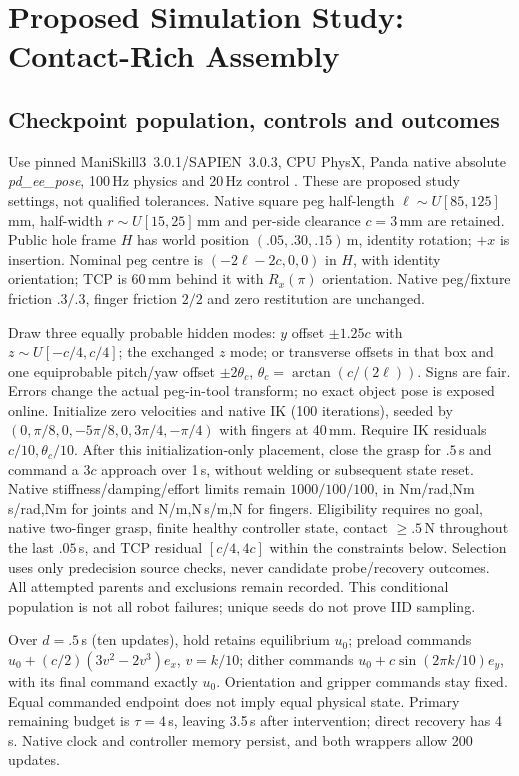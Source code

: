 \section{Proposed Simulation Study: Contact-Rich Assembly}
\subsection{Checkpoint population, controls and outcomes}
Use pinned ManiSkill3~3.0.1/SAPIEN~3.0.3, CPU PhysX, Panda native absolute \emph{pd\_ee\_pose}, 100\,Hz physics and 20\,Hz control \citep{tao2025}. These are proposed study settings, not qualified tolerances. Native square peg half-length $\ell\sim U[85, 125]$\,mm, half-width $r\sim U[15, 25]$\,mm and per-side clearance $c=3$\,mm are retained. Public hole frame $H$ has world position $(.05,.30,.15)$\,m, identity rotation; $+x$ is insertion. Nominal peg centre is $(-2\ell-2c, 0, 0)$ in $H$, with identity orientation; TCP is 60\,mm behind it with $R_x(\pi)$ orientation. Native peg/fixture friction $.3/.3$, finger friction $2/2$ and zero restitution are unchanged.

Draw three equally probable hidden modes: $y$ offset $\pm1.25c$ with $z\sim U[-c/4,c/4]$; the exchanged $z$ mode; or transverse offsets in that box and one equiprobable pitch/yaw offset $\pm2\theta_c$, $\theta_c=\arctan(c/(2\ell))$. Signs are fair. Errors change the actual peg-in-tool transform; no exact object pose is exposed online. Initialize zero velocities and native IK (100 iterations), seeded by $(0,\pi/8,0,-5\pi/8,0,3\pi/4,-\pi/4)$ with fingers at 40\,mm. Require IK residuals $c/10,\theta_c/10$. After this initialization-only placement, close the grasp for $.5$\,s and command a $3c$ approach over 1\,s, without welding or subsequent state reset. Native stiffness/damping/effort limits remain $1000/100/100$, in Nm/rad,Nm\,s/rad,Nm for joints and N/m,N\,s/m,N for fingers. Eligibility requires no goal, native two-finger grasp, finite healthy controller state, contact $\ge.5$\,N throughout the last $.05$\,s, and TCP residual $[c/4, 4c]$ within the constraints below. Selection uses only predecision source checks, never candidate probe/recovery outcomes. All attempted parents and exclusions remain recorded. This conditional population is not all robot failures; unique seeds do not prove IID sampling.

Over $d=.5$\,s (ten updates), hold retains equilibrium $u_0$; preload commands $u_0+(c/2)(3v^2-2v^3)e_x$, $v=k/10$; dither commands $u_0+c\sin(2\pi k/10)e_y$, with its final command exactly $u_0$. Orientation and gripper commands stay fixed. Equal commanded endpoint does not imply equal physical state. Primary remaining budget is $\tau=4$\,s, leaving 3.5\,s after intervention; direct recovery has 4\,s. Native clock and controller memory persist, and both wrappers allow 200 updates.

